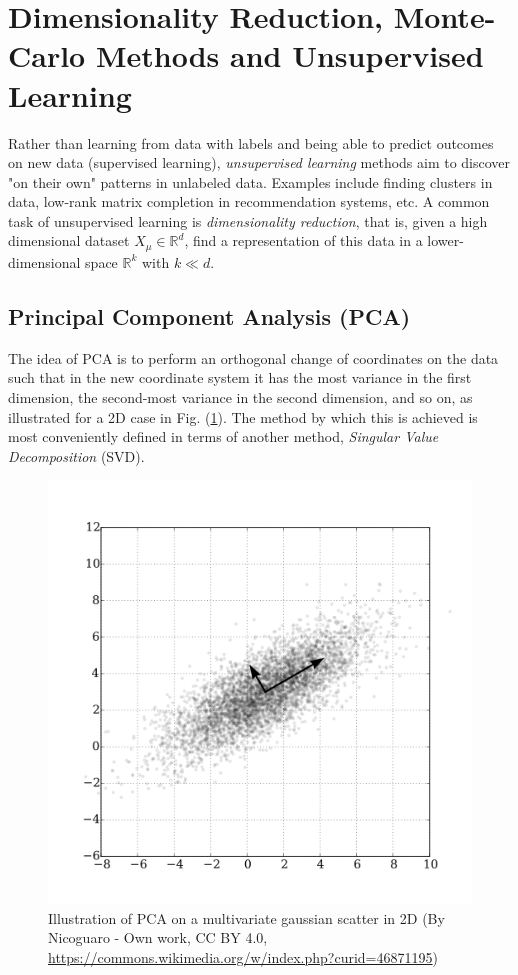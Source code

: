 \documentclass{article}
\begin{document}
\newpage
\section{Dimensionality Reduction, Monte-Carlo Methods and Unsupervised Learning}
Rather than learning from data with labels and being able to predict outcomes on new data (supervised learning), \emph{unsupervised learning} methods aim to discover "on their own" patterns in unlabeled data. Examples include finding clusters in data, low-rank matrix completion in recommendation systems, etc. A common task of unsupervised learning is \emph{dimensionality reduction}, that is, given a high dimensional dataset $X_{\mu} \in \mathbb{R}^d$, find a representation of this data in a lower-dimensional space $\mathbb{R}^k$ with $k\ll d$.

\subsection{Principal Component Analysis (PCA)}
The idea of PCA is to perform an orthogonal change of coordinates on the data such that in the new coordinate system it has the most variance in the first dimension, the second-most variance in the second dimension, and so on, as illustrated for a 2D case in Fig. (\ref{fig:pca}). The method by which this is achieved is most conveniently defined in terms of another method, \emph{Singular Value Decomposition} (SVD).
\begin{figure}[h]
    \centering
    \includegraphics[width=0.5\linewidth]{PCA}
    \caption{Illustration of PCA on a multivariate gaussian scatter in 2D (By Nicoguaro - Own work, CC BY 4.0, \url{https://commons.wikimedia.org/w/index.php?curid=46871195})}
    \label{fig:pca}
\end{figure}
\end{document}
